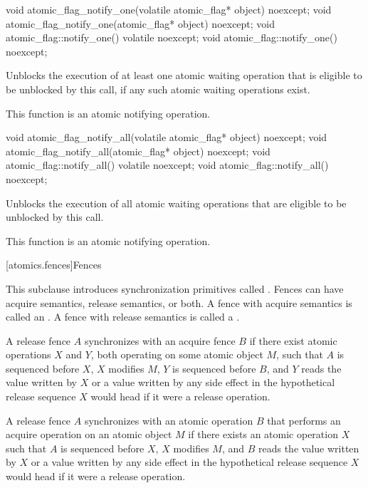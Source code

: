 \begin{itemdecl}
void atomic_flag_notify_one(volatile atomic_flag* object) noexcept;
void atomic_flag_notify_one(atomic_flag* object) noexcept;
void atomic_flag::notify_one() volatile noexcept;
void atomic_flag::notify_one() noexcept;
\end{itemdecl}

\begin{itemdescr}
\pnum
\effects
Unblocks the execution of at least one atomic waiting operation
that is eligible to be unblocked by this call,
if any such atomic waiting operations exist.

\pnum
\remarks
This function is an atomic notifying operation.
\end{itemdescr}

\begin{itemdecl}
void atomic_flag_notify_all(volatile atomic_flag* object) noexcept;
void atomic_flag_notify_all(atomic_flag* object) noexcept;
void atomic_flag::notify_all() volatile noexcept;
void atomic_flag::notify_all() noexcept;
\end{itemdecl}

\begin{itemdescr}
\pnum
\effects
Unblocks the execution of all atomic waiting operations
that are eligible to be unblocked by this call.

\pnum
\remarks
This function is an atomic notifying operation.
\end{itemdescr}

[atomics.fences]{Fences}

\pnum
This subclause introduces synchronization primitives called . Fences can have
acquire semantics, release semantics, or both. A fence with acquire semantics is called
an . A fence with release semantics is called a .

\pnum
A release fence $A$ synchronizes with an acquire fence $B$ if there exist
atomic operations $X$ and $Y$, both operating on some atomic object
$M$, such that $A$ is sequenced before $X$, $X$ modifies
$M$, $Y$ is sequenced before $B$, and $Y$ reads the value
written by $X$ or a value written by any side effect in the hypothetical release
sequence $X$ would head if it were a release operation.

\pnum
A release fence $A$ synchronizes with an atomic operation $B$ that
performs an acquire operation on an atomic object $M$ if there exists an atomic
operation $X$ such that $A$ is sequenced before $X$, $X$
modifies $M$, and $B$ reads the value written by $X$ or a value
written by any side effect in the hypothetical release sequence $X$ would head if
it were a release operation.

